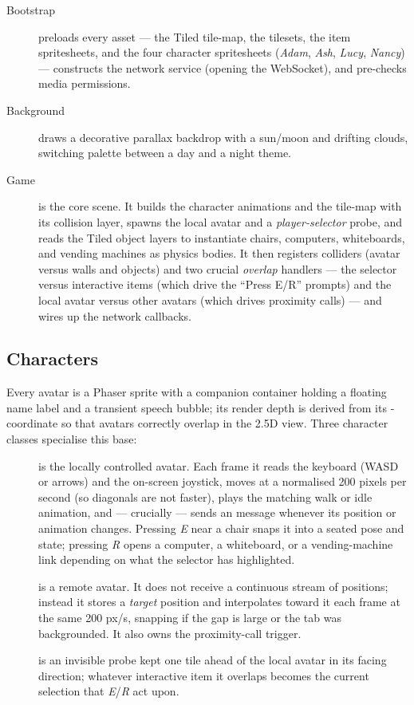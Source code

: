 \begin{description}
  \item[Bootstrap] preloads every asset --- the Tiled tile-map, the tilesets, the
  item spritesheets, and the four character spritesheets (\emph{Adam}, \emph{Ash},
  \emph{Lucy}, \emph{Nancy}) --- constructs the network service (opening the
  WebSocket), and pre-checks media permissions.
  \item[Background] draws a decorative parallax backdrop with a sun/moon and
  drifting clouds, switching palette between a day and a night theme.
  \item[Game] is the core scene. It builds the character animations and the
  tile-map with its collision layer, spawns the local avatar and a
  \emph{player-selector} probe, and reads the Tiled object layers to instantiate
  chairs, computers, whiteboards, and vending machines as physics bodies. It then
  registers colliders (avatar versus walls and objects) and two crucial
  \emph{overlap} handlers --- the selector versus interactive items (which drive
  the ``Press E/R'' prompts) and the local avatar versus other avatars (which
  drives proximity calls) --- and wires up the network callbacks.
\end{description}

\subsection{Characters}

Every avatar is a Phaser sprite with a companion container holding a floating name
label and a transient speech bubble; its render depth is derived from its
-coordinate so that avatars correctly overlap in the 2.5D view. Three
character classes specialise this base:

\begin{description}
  \item[] is the locally controlled avatar. Each frame it reads the
  keyboard (WASD or arrows) and the on-screen joystick, moves at a normalised 200
  pixels per second (so diagonals are not faster), plays the matching walk or idle
  animation, and --- crucially --- sends an  message whenever
  its position or animation changes. Pressing \emph{E} near a chair snaps it into a
  seated pose and state; pressing \emph{R} opens a computer, a whiteboard, or a
  vending-machine link depending on what the selector has highlighted.
  \item[] is a remote avatar. It does not receive a continuous
  stream of positions; instead it stores a \emph{target} position and interpolates
  toward it each frame at the same 200 px/s, snapping if the gap is large or the
  tab was backgrounded. It also owns the proximity-call trigger.
  \item[] is an invisible probe kept one tile ahead of the
  local avatar in its facing direction; whatever interactive item it overlaps
  becomes the current selection that \emph{E}/\emph{R} act upon.
\end{description}

